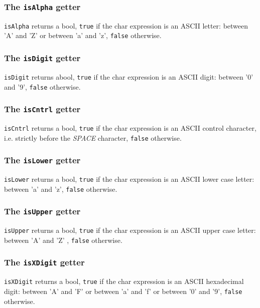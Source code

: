 \documentclass[10pt,openright,twosides,final]{memoir}
\newcommand{\ccst}[1]{{\footnotesize\ttfamily\colorbox{light-blue}{'#1'}}}
\newcommand{\gtlinline}[1]{\colorbox{light-blue}{\lstinline[language=gtl]{#1}}}
\begin{document}
\subsubsection{The \texttt{isAlpha} getter}

\gtlinline{isAlpha} returns a bool, \gtlinline{true} if the char expression is an ASCII letter: between \ccst{A} and \ccst{Z} or between \ccst{a} and \ccst{z}, \gtlinline{false} otherwise.

\subsubsection{The \texttt{isDigit} getter}

\gtlinline{isDigit} returns abool, \gtlinline{true} if the char expression is an ASCII digit: between \ccst{0} and \ccst{9}, \gtlinline{false} otherwise.

\subsubsection{The \texttt{isCntrl} getter}

\gtlinline{isCntrl} returns a bool, \gtlinline{true} if the char expression is an ASCII control character, i.e. strictly before the {\em SPACE} character, \gtlinline{false} otherwise.

\subsubsection{The \texttt{isLower} getter}

\gtlinline{isLower} returns a bool, \gtlinline{true} if the char expression is an ASCII lower case letter: between \ccst{a} and \ccst{z}, \gtlinline{false} otherwise.

\subsubsection{The \texttt{isUpper} getter}

\gtlinline{isUpper} returns a bool, \gtlinline{true} if the char expression is an ASCII upper case letter: between \ccst{A} and \ccst{Z} , \gtlinline{false} otherwise.

\subsubsection{The \texttt{isXDigit} getter}

\gtlinline{isXDigit} returns a bool, \texttt{true} if the char expression is an ASCII hexadecimal digit: between \ccst{A} and \ccst{F} or between \ccst{a} and \ccst{f} or between \ccst{0} and \ccst{9}, \texttt{false} otherwise.
  
\end{document}

